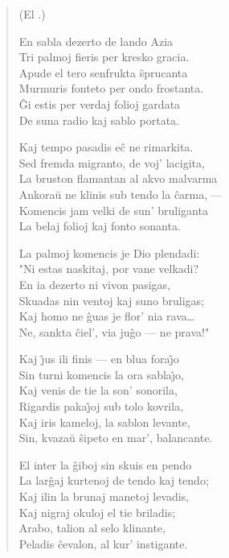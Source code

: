 \begin{verse}
\begin{center}
\footnotesize (El .)
\end{center}
                   \vin  En sabla dezerto de lando Azia\\
                  Tri palmoj fieris per kresko gracia.\\
                  Apude el tero senfrukta \^sprucanta\\
                  Murmuris fonteto per ondo frostanta.\\
                  \^Gi estis per verdaj folioj gardata\\
                  De suna radio kaj sablo portata.

                   \vin  Kaj tempo pasadis e\^c ne rimarkita.\\
                  Sed fremda migranto, de voj' lacigita,\\
                  La bruston flamantan al akvo malvarma\\
                  Ankora\u u ne klinis sub tendo la \^carma, ---\\
                  Komencis jam velki de sun' bruliganta\\
                  La belaj folioj kaj fonto sonanta.

                  \vin   La palmoj komencis je Dio plendadi:\\
                  "Ni estas naskitaj, por vane velkadi?\\
                  En ia dezerto ni vivon pasigas,\\
                  Skuadas nin ventoj kaj suno bruligas;\\
                  Kaj homo ne \^guas je flor' nia rava\dots\\
                  Ne, sankta \^ciel', via ju\^go --- ne prava!"

                  \vin   Kaj \^{\j}us ili finis --- en blua fora\^{\j}o\\
                  Sin turni komencis la ora sabla\^{\j}o,\\
                  Kaj venis de tie la son' sonorila,\\
                  Rigardis paka\^{\j}oj sub tolo kovrila,\\
                  Kaj iris kameloj, la sablon levante,\\
                  Sin, kvaza\u u \^sipeto en mar', balancante.

                  \vin   El inter la \^giboj sin skuis en pendo\\
                  La lar\^gaj kurtenoj de tendo kaj tendo;\\
                  Kaj ilin la brunaj manetoj levadis,\\
                  Kaj nigraj okuloj el tie briladis;\\
                  Arabo, talion al selo klinante,\\
                  Peladis \^cevalon, al kur' instigante.


\end{verse}
